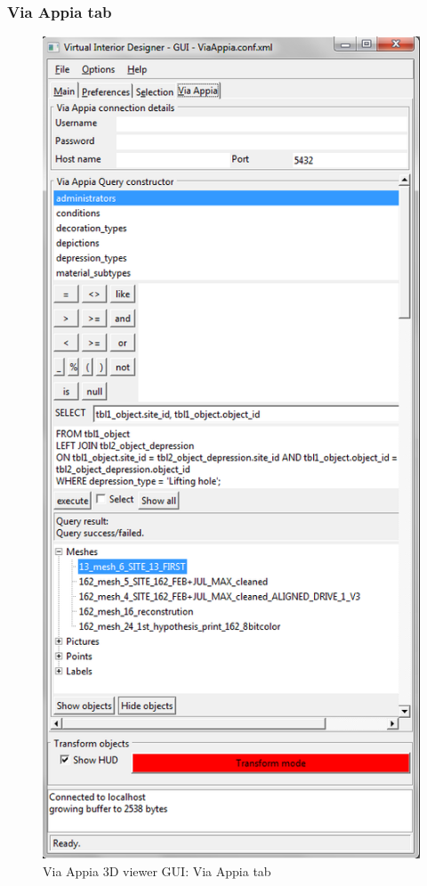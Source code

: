 \documentclass[a4paper,11pt]{article}
\begin{document}
\subsubsection{Via Appia tab}

\begin{figure}[!ht]
\centering
\includegraphics[scale=0.5]{fig/viaappia}
\caption{Via Appia 3D viewer GUI: Via Appia tab}
\label{fig-guiva}
\end{figure}
\end{document}
